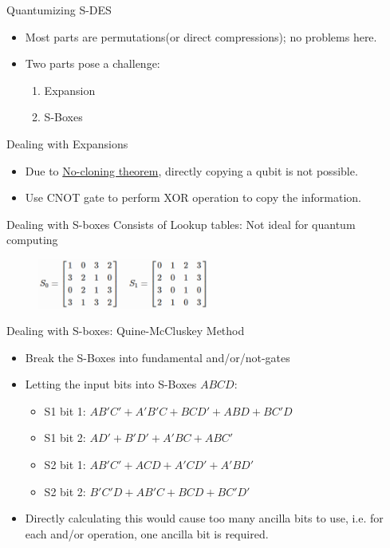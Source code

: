 \documentclass{beamer}
\begin{document}
    \begin{frame}{Quantumizing S-DES}
        \begin{itemize}
            \item Most parts are permutations(or direct compressions); no problems here.
            \item Two parts pose a challenge:
	        \begin{enumerate}
	            \item Expansion
	            \item S-Boxes
	        \end{enumerate}
        \end{itemize}
    \end{frame}

    \begin{frame}{Dealing with Expansions}
        \begin{itemize}
            \item Due to \href{https://en.wikipedia.org/wiki/No-cloning_theorem}{No-cloning theorem}, directly copying a qubit is not possible.
            \item Use CNOT gate to perform XOR operation to copy the information.
        \end{itemize}
    \end{frame}

    \begin{frame}{Dealing with S-boxes}
        Consists of Lookup tables: Not ideal for quantum computing
        \begin{figure}[h]
            \centering
            \includegraphics[width=0.5\textwidth]{./Images/sbox.png}
        \end{figure}
    \end{frame}

    \begin{frame}{Dealing with S-boxes: Quine-McCluskey Method}
        \begin{itemize}
            \item Break the S-Boxes into fundamental and/or/not-gates
            \item Letting the input bits into S-Boxes $ABCD$:
            \begin{itemize}
                \item S1 bit 1: $AB'C'+A'B'C+BCD'+ABD+BC'D$
                \item S1 bit 2: $AD'+B'D'+A'BC+ABC'$
                \item S2 bit 1: $AB'C'+ACD+A'CD'+A'BD'$
                \item S2 bit 2: $B'C'D+AB'C+BCD+BC'D'$
            \end{itemize}
            \item Directly calculating this would cause too many ancilla bits to use, i.e. for each and/or operation, one ancilla bit is required.
        \end{itemize}
    \end{frame}
\end{document}
